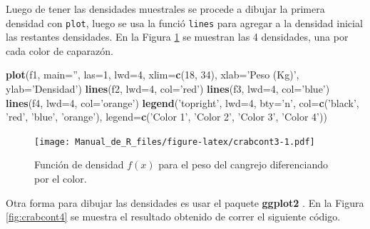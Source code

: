 \documentclass[10pt,]{krantz}
\makeatletter
\newenvironment{Shaded}{\begin{snugshade}}{\end{snugshade}}
\newcommand{\KeywordTok}[1]{\textcolor[rgb]{0.13,0.29,0.53}{\textbf{#1}}}
\newcommand{\DataTypeTok}[1]{\textcolor[rgb]{0.13,0.29,0.53}{#1}}
\newcommand{\DecValTok}[1]{\textcolor[rgb]{0.00,0.00,0.81}{#1}}
\newcommand{\StringTok}[1]{\textcolor[rgb]{0.31,0.60,0.02}{#1}}
\newcommand{\NormalTok}[1]{#1}
\newenvironment{kframe}{%
\medskip{}
\setlength{\fboxsep}{.8em}
 \def\at@end@of@kframe{}%
 \ifinner\ifhmode%
  \def\at@end@of@kframe{\end{minipage}}%
  \begin{minipage}{\columnwidth}%
 \fi\fi%
 \def\FrameCommand##1{\hskip\@totalleftmargin \hskip-\fboxsep
 \colorbox{shadecolor}{##1}\hskip-\fboxsep
     \hskip-\linewidth \hskip-\@totalleftmargin \hskip\columnwidth}%
 \MakeFramed {\advance\hsize-\width
   \@totalleftmargin\z@ \linewidth\hsize
   \@setminipage}}%
 {\par\unskip\endMakeFramed%
 \at@end@of@kframe}
\renewenvironment{Shaded}{\begin{kframe}}{\end{kframe}}
\makeatother
\begin{document}
Luego de tener las densidades muestrales se procede a dibujar la primera
densidad con \texttt{plot}, luego se usa la funció \texttt{lines} para
agregar a la densidad inicial las restantes densidades. En la Figura
\ref{fig:crabcont3} se muestran las 4 densidades, una por cada color de
caparazón.

\begin{Shaded}
\begin{Highlighting}[]
\KeywordTok{plot}\NormalTok{(f1, }\DataTypeTok{main=}\StringTok{''}\NormalTok{, }\DataTypeTok{las=}\DecValTok{1}\NormalTok{, }\DataTypeTok{lwd=}\DecValTok{4}\NormalTok{,}
     \DataTypeTok{xlim=}\KeywordTok{c}\NormalTok{(}\DecValTok{18}\NormalTok{, }\DecValTok{34}\NormalTok{),}
     \DataTypeTok{xlab=}\StringTok{'Peso (Kg)'}\NormalTok{, }\DataTypeTok{ylab=}\StringTok{'Densidad'}\NormalTok{)}
\KeywordTok{lines}\NormalTok{(f2, }\DataTypeTok{lwd=}\DecValTok{4}\NormalTok{, }\DataTypeTok{col=}\StringTok{'red'}\NormalTok{)}
\KeywordTok{lines}\NormalTok{(f3, }\DataTypeTok{lwd=}\DecValTok{4}\NormalTok{, }\DataTypeTok{col=}\StringTok{'blue'}\NormalTok{)}
\KeywordTok{lines}\NormalTok{(f4, }\DataTypeTok{lwd=}\DecValTok{4}\NormalTok{, }\DataTypeTok{col=}\StringTok{'orange'}\NormalTok{)}
\KeywordTok{legend}\NormalTok{(}\StringTok{'topright'}\NormalTok{, }\DataTypeTok{lwd=}\DecValTok{4}\NormalTok{, }\DataTypeTok{bty=}\StringTok{'n'}\NormalTok{,}
       \DataTypeTok{col=}\KeywordTok{c}\NormalTok{(}\StringTok{'black'}\NormalTok{, }\StringTok{'red'}\NormalTok{, }\StringTok{'blue'}\NormalTok{, }\StringTok{'orange'}\NormalTok{),}
       \DataTypeTok{legend=}\KeywordTok{c}\NormalTok{(}\StringTok{'Color 1'}\NormalTok{, }\StringTok{'Color 2'}\NormalTok{, }\StringTok{'Color 3'}\NormalTok{, }\StringTok{'Color 4'}\NormalTok{))}
\end{Highlighting}
\end{Shaded}

\begin{figure}
\centering
\texttt{[image: Manual\_de\_R\_files/figure-latex/crabcont3-1.pdf]}
\caption{\label{fig:crabcont3}Función de densidad \(f(x)\) para el peso del
cangrejo diferenciando por el color.}
\end{figure}

Otra forma para dibujar las densidades es usar el paquete
\textbf{ggplot2} \citep{R-ggplot2}. En la Figura \ref{fig:crabcont4} se
muestra el resultado obtenido de correr el siguiente código.
\end{document}
